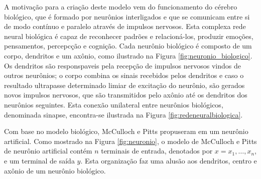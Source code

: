 A motivação para a criação deste modelo vem do funcionamento do cérebro biológico, que é formado por neurônios interligados e que se comunicam entre si de modo contínuo e paralelo através de impulsos nervosos. Esta complexa rede neural biológica é capaz de reconhecer padrões e relacioná-los, produzir emoções, pensamentos, percepcção e cognição. Cada neurônio biológico é composto de um corpo, dendritos e um axônio, como ilustrado na Figura \ref{fig:neuronio_biologico}. Os dendritos são responspaveis pela recepção de impulsos nervosos vindos de outros neurônios; o corpo combina os sinais recebidos pelos dendritos e caso o resultado ultrapasse determinado limiar de excitação do neurônio, são gerados novos impulsos nervosos, que são transmitidos pelo axônio até os dendritos dos neurônios seguintes. Esta conexão unilateral entre neurônios biológicos, denominada sinapse, encontra-se ilustrada na Figura \ref{fig:redeneuralbiologica}.

Com base no modelo biológico, McCulloch e Pitts propuseram em \cite{mcculloch1943logical} um neurônio artificial. Como mostrado na Figura \ref{fig:neuronio}, o modelo de McCulloch e Pitts de neurônio artificial contém $n$ terminais de entrada, denotados por $x = x_1, \ldots, x_n$, e um terminal de saída $y$. Esta organização faz uma alusão aos dendritos, centro e axônio de um neurônio biológico.

